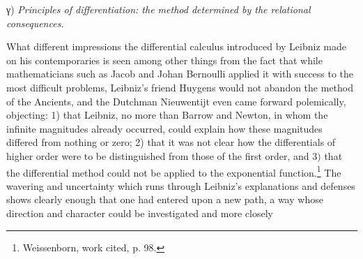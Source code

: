 \documentclass[12pt,a4paper,openany]{book}
\newcommand{\opage}[1]{\marginnote{\footnotesize\textit{[#1]}}}
\begin{document}
\begin{center}γ) \emph{Principles of differentiation: the method determined by the relational consequences.}\end{center}

What different impressions the differential calculus introduced by Leibniz
made on his contemporaries is seen
among other things from the fact that while mathematicians such as Jacob and Johan
Bernoulli applied it with success to the most difficult %
problems, Leibniz's friend Huygens would not abandon the
method of the Ancients, and the Dutchman Nieuwentijt even came forward
polemically, objecting: 1) that Leibniz, no more
than Barrow and Newton, in whom the infinite
magnitudes already occurred, could explain how these
magnitudes differed from nothing or zero; 2) that it was not
\setcounter{footnote}{0}%
\opage{91}clear how the differentials of higher order were to be
distinguished from those of the first order, and $3)$ that the differential method
could not be applied to the exponential function.\footnote[1]{Weissenborn, work cited, p. 98.}
The wavering and uncertainty which runs through Leibniz's
explanations and defenses shows clearly enough that one had
entered upon a new path, a way whose direction and
character could be investigated and more closely
\end{document}

